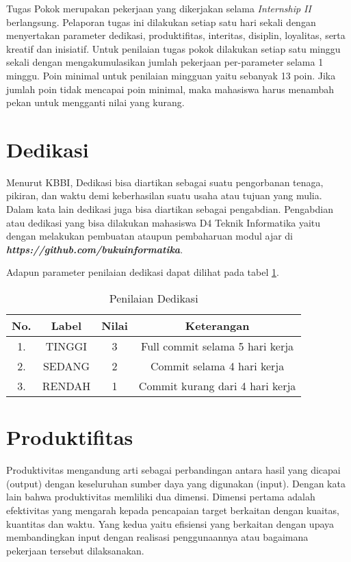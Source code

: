 Tugas Pokok merupakan pekerjaan yang dikerjakan selama \textit{Internship II} berlangsung. Pelaporan tugas ini dilakukan setiap satu hari sekali dengan menyertakan parameter dedikasi, produktifitas, interitas, disiplin, loyalitas, serta kreatif dan inisiatif. Untuk penilaian tugas pokok dilakukan setiap satu minggu sekali dengan mengakumulasikan jumlah pekerjaan per-parameter selama 1 minggu. Poin minimal untuk penilaian mingguan yaitu sebanyak 13 poin. Jika jumlah poin tidak mencapai poin minimal, maka mahasiswa harus menambah pekan untuk mengganti nilai yang kurang.

\section{Dedikasi}

Menurut KBBI, Dedikasi bisa diartikan sebagai suatu pengorbanan tenaga, pikiran, dan waktu demi keberhasilan suatu usaha atau tujuan yang mulia. Dalam kata lain dedikasi juga bisa diartikan sebagai pengabdian. Pengabdian atau dedikasi yang bisa dilakukan mahasiswa D4 Teknik Informatika yaitu dengan melakukan pembuatan ataupun pembaharuan modul ajar di \textbf{\textit{https://github.com/bukuinformatika}}.

Adapun parameter penilaian dedikasi dapat dilihat pada tabel \ref{tab:nilaidedikasi}.

\begin{table}[H]
\caption{Penilaian Dedikasi}
\centering
\begin{tabular}{|c|c|c|c|}
\hline
\textbf{No.}&\textbf{Label}&\textbf{Nilai}&\textbf{Keterangan}\\
\hline
1.&TINGGI&3&Full commit selama 5 hari kerja\\
\hline
2.&SEDANG&2&Commit selama 4 hari kerja\\
\hline
3.&RENDAH&1&Commit kurang dari 4 hari kerja\\
\hline
\end{tabular}
\label{tab:nilaidedikasi}
\end{table}

\section{Produktifitas}
Produktivitas mengandung arti sebagai perbandingan antara hasil yang dicapai (output) dengan keseluruhan sumber daya yang digunakan (input). Dengan kata lain bahwa produktivitas memliliki dua dimensi. Dimensi pertama adalah efektivitas yang mengarah kepada pencapaian target berkaitan dengan kuaitas, kuantitas dan waktu. Yang kedua yaitu efisiensi yang berkaitan dengan upaya membandingkan input dengan realisasi penggunaannya atau bagaimana pekerjaan tersebut dilaksanakan.

